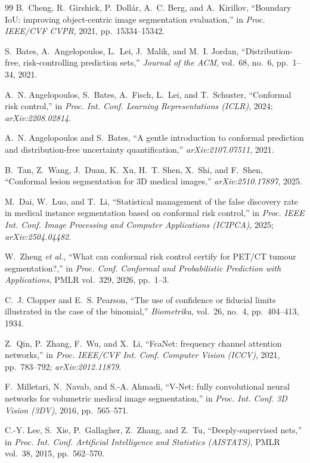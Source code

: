\documentclass[journal]{IEEEtran}
\begin{document}
\begin{thebibliography}{99}
B.~Cheng, R.~Girshick, P.~Doll\'ar, A.~C. Berg, and A.~Kirillov, ``Boundary IoU: improving object-centric image segmentation evaluation,'' in \emph{Proc. IEEE/CVF CVPR}, 2021, pp.~15334--15342.

S.~Bates, A.~Angelopoulos, L.~Lei, J.~Malik, and M.~I. Jordan, ``Distribution-free, risk-controlling prediction sets,'' \emph{Journal of the ACM}, vol.~68, no.~6, pp.~1--34, 2021.

A.~N. Angelopoulos, S.~Bates, A.~Fisch, L.~Lei, and T.~Schuster, ``Conformal risk control,'' in \emph{Proc. Int. Conf. Learning Representations (ICLR)}, 2024; \emph{arXiv:2208.02814}.

A.~N. Angelopoulos and S.~Bates, ``A gentle introduction to conformal prediction and distribution-free uncertainty quantification,'' \emph{arXiv:2107.07511}, 2021.

B.~Tan, Z.~Wang, J.~Duan, K.~Xu, H.~T. Shen, X.~Shi, and F.~Shen, ``Conformal lesion segmentation for 3D medical images,'' \emph{arXiv:2510.17897}, 2025.

M.~Dai, W.~Luo, and T.~Li, ``Statistical management of the false discovery rate in medical instance segmentation based on conformal risk control,'' in \emph{Proc. IEEE Int. Conf. Image Processing and Computer Applications (ICIPCA)}, 2025; \emph{arXiv:2504.04482}.

W.~Zheng \emph{et al.}, ``What can conformal risk control certify for PET/CT tumour segmentation?,'' in \emph{Proc. Conf. Conformal and Probabilistic Prediction with Applications}, PMLR vol.~329, 2026, pp.~1--3.

C.~J. Clopper and E.~S. Pearson, ``The use of confidence or fiducial limits illustrated in the case of the binomial,'' \emph{Biometrika}, vol.~26, no.~4, pp.~404--413, 1934.

Z.~Qin, P.~Zhang, F.~Wu, and X.~Li, ``FcaNet: frequency channel attention networks,'' in \emph{Proc. IEEE/CVF Int. Conf. Computer Vision (ICCV)}, 2021, pp.~783--792; \emph{arXiv:2012.11879}.

F.~Milletari, N.~Navab, and S.-A. Ahmadi, ``V-Net: fully convolutional neural networks for volumetric medical image segmentation,'' in \emph{Proc. Int. Conf. 3D Vision (3DV)}, 2016, pp.~565--571.

C.-Y. Lee, S.~Xie, P.~Gallagher, Z.~Zhang, and Z.~Tu, ``Deeply-supervised nets,'' in \emph{Proc. Int. Conf. Artificial Intelligence and Statistics (AISTATS)}, PMLR vol.~38, 2015, pp.~562--570.


\end{thebibliography}
\end{document}
